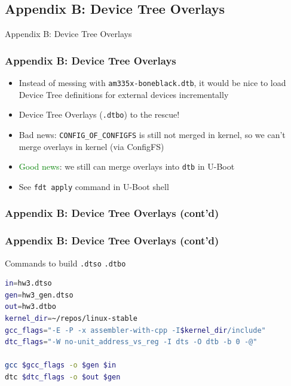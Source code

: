 \documentclass[aspectratio=169,usenames,dvipsnames]{beamer}
\newcounter{cont}
\begin{document}
\subsection{Appendix B: Device Tree Overlays}

\begin{frame}[standout]
  Appendix B: Device Tree Overlays
\end{frame}

\begin{frame}
  \frametitle{Appendix B: Device Tree Overlays}
  \begin{itemize}
    \item Instead of messing with \texttt{am335x-boneblack.dtb}, it would be
          nice to load Device Tree definitions for external devices
          incrementally
    \item Device Tree Overlays (\texttt{.dtbo}) to the rescue!
    \item \alert{Bad news}: \texttt{CONFIG\_OF\_CONFIGFS} is still not merged
          in kernel, so we can't merge overlays in kernel (via ConfigFS)
    \item \textcolor{green}{Good news}: we still can merge overlays into
          \texttt{dtb} in U-Boot
    \item See \texttt{fdt apply} command in U-Boot shell
  \end{itemize}
\end{frame}

\begin{frame}[containsverbatim,allowframebreaks=1]
  \frametitle{Appendix B: Device Tree Overlays (cont'd)}
  
\end{frame}

\begin{frame}[containsverbatim]
  \frametitle{Appendix B: Device Tree Overlays (cont'd)}
  Commands to build \texttt{.dtso} \textrightarrow \texttt{.dtbo}
  \begin{lstlisting}[language=bash,numbers=none]
in=hw3.dtso
gen=hw3_gen.dtso
out=hw3.dtbo
kernel_dir=~/repos/linux-stable
gcc_flags="-E -P -x assembler-with-cpp -I$kernel_dir/include"
dtc_flags="-W no-unit_address_vs_reg -I dts -O dtb -b 0 -@"

gcc $gcc_flags -o $gen $in
dtc $dtc_flags -o $out $gen
  \end{lstlisting}
\end{frame}
\end{document}
